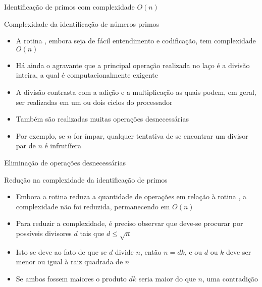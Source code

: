 \begin{frame}[fragile]{Identificação de primos com complexidade $O(n)$}
\end{frame}


\begin{frame}[fragile]{Complexidade da identificação de números primos}

    \begin{itemize}
        \item A rotina , embora seja de fácil entendimento e codificação, tem
            complexidade $O(n)$

        \item Há ainda o agravante que a principal operação realizada no laço é a divisão inteira,
            a qual é computacionalmente exigente

        \item A divisão contrasta com a adição e a multiplicação as quais podem, em geral, ser
            realizadas em um ou dois ciclos do processador

        \item Também são realizadas muitas operações desnecessárias

        \item Por exemplo, se $n$ for ímpar, qualquer tentativa de se encontrar um divisor par
            de $n$ é infrutífera
    \end{itemize}

\end{frame}

\begin{frame}[fragile]{Eliminação de operações desnecessárias}
\end{frame}

\begin{frame}[fragile]{Redução na complexidade da identificação de primos}

    \begin{itemize}
        \item Embora a rotina  reduza a quantidade de operações em relação à
            rotina , a complexidade não foi reduzida, permanecendo em $O(n)$

        \item Para reduzir a complexidade, é preciso observar que deve-se procurar por possíveis
            divisores $d$ tais que $d \leq \sqrt{n}$

        \item Isto se deve ao fato de que se $d$ divide $n$, então $n = dk$, e ou $d$ ou $k$ deve
            ser menor ou igual à raiz quadrada de $n$

        \item Se ambos fossem maiores o produto $dk$ seria maior do que $n$, uma contradição
    \end{itemize}

\end{frame}

